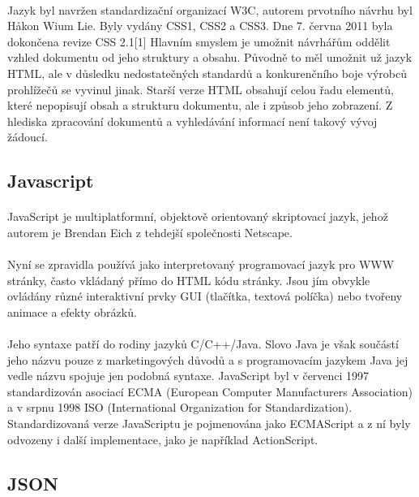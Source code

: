 \paragraph{}
Jazyk byl navržen standardizační organizací W3C, autorem prvotního návrhu byl Håkon Wium Lie. Byly vydány CSS1, CSS2 a CSS3. Dne 7. června 2011 byla dokončena revize CSS 2.1[1] Hlavním smyslem je umožnit návrhářům oddělit vzhled dokumentu od jeho struktury a obsahu. Původně to měl umožnit už jazyk HTML, ale v důsledku nedostatečných standardů a konkurenčního boje výrobců prohlížečů se vyvinul jinak. Starší verze HTML obsahují celou řadu elementů, které nepopisují obsah a strukturu dokumentu, ale i způsob jeho zobrazení. Z hlediska zpracování dokumentů a vyhledávání informací není takový vývoj žádoucí.


\subsection{Javascript}
\paragraph{}
JavaScript je multiplatformní, objektově orientovaný skriptovací jazyk, jehož autorem je Brendan Eich z tehdejší společnosti Netscape.
\paragraph{}
Nyní se zpravidla používá jako interpretovaný programovací jazyk pro WWW stránky, často vkládaný přímo do HTML kódu stránky. Jsou jím obvykle ovládány různé interaktivní prvky GUI (tlačítka, textová políčka) nebo tvořeny animace a efekty obrázků.
\paragraph{}
Jeho syntaxe patří do rodiny jazyků C/C++/Java. Slovo Java je však součástí jeho názvu pouze z marketingových důvodů a s programovacím jazykem Java jej vedle názvu spojuje jen podobná syntaxe. JavaScript byl v červenci 1997 standardizován asociací ECMA (European Computer Manufacturers Association) a v srpnu 1998 ISO (International Organization for Standardization). Standardizovaná verze JavaScriptu je pojmenována jako ECMAScript a z ní byly odvozeny i další implementace, jako je například ActionScript.

\subsection{JSON}
